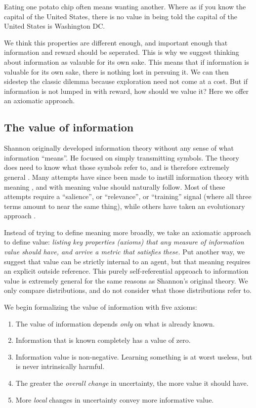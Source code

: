 \documentclass[9pt,twocolumn,twoside]{pnas-new}
\begin{document}
Eating one potato chip often means wanting another. Where as if you know the capital of the United States, there is no value in being told the capital of the United States is Washington DC. 

We think this properties are different enough, and important enough that information and reward should be seperated. This is why we suggest thinking about information as valauble for its own sake. This means that if information is valuable for its own sake, there is nothing lost in persuing it. We can then sidestep the classic dilemma because exploration need not come at a cost. But if information is not lumped in with reward, how should we value it? Here we offer an axiomatic approach.

\subsection*{The value of information}
Shannon originally developed information theory without any sense of what information ``means''. He focused on simply transmitting symbols. The theory does need to know what those symbols refer to, and is therefore extremely general \citep{Shannon1948}. Many attempts have since been made to instill information theory with meaning \citep{Kolchinsky2018}, and with meaning value should naturally follow. Most of these attempts require a ``salience'', or ``relevance'', or ``training'' signal (where all three terms amount to near the same thing), while others have taken an evolutionary approach \citep{Kolchinsky2018}.  %

Instead of trying to define meaning more broadly, we take an axiomatic approach to define value: \textit{listing key properties (axioms) that any measure of information value should have, and arrive a metric that satisfies these.} Put another way, we suggest that value can be strictly internal to an agent, but that meaning requires an explicit outside reference. This purely self-referential approach to information value is extremely general for the same reasons as Shannon's original theory. We only compare distributions, and do not consider what those distributions refer to.

We begin formalizing the value of information with five axioms:

\begin{enumerate}
    \item The value of information depends \textit{only} on what is already known.
    \item Information that is known completely has a value of zero.
    \item Information value is non-negative. Learning something is at worst useless, but is never intrinsically harmful.
    \item The greater the \textit{overall change} in uncertainty, the more value it should have.
    \item More \textit{local} changes in uncertainty convey more informative value.
\end{enumerate}
\end{document}
